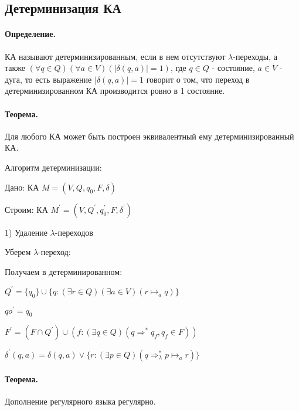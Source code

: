 \documentclass{report}
\newcommand{\pathto}[1][1]{ \Rightarrow^{*}_{#1} }
\begin{document}
\subsection{Детерминизация КА}
\paragraph*{Определение.}
КА называют детерминизированным, если в нем отсутствуют $\lambda$-переходы, а
также  $(\forall q \in Q)(\forall a \in V)( \mid \delta(q,a) \mid = 1)$, где
$q \in Q$ - состояние, $a \in V$ - дуга, то есть выражение $ \mid \delta(q,a) \mid = 1$ говорит о том,
что переход в детерминизированном КА производится ровно в 1 состояние.

\paragraph*{Теорема.}
Для любого КА может быть построен эквивалентный ему детерминизированный КА.

Алгоритм детерминизации:

Дано: КА $M = (V, Q, q_0,F,\delta)$

Строим: КА $M^{\prime} = (V, Q^{\prime},q_0^{\prime},F,\delta^{\prime})$

1) Удаление $\lambda$-переходов

Уберем $\lambda$-переход:

Получаем в детерминированном:

\medskip

$Q^{\prime} = \{q_0\} \cup \{q: (\exists r \in Q)(\exists a \in V)(r \mapsto_{a} q)\} $

$qo^{\prime} = q_0$ 

$F^{\prime} = (F \cap Q^{\prime}) \cup (f: (\exists q \in Q)(q \pathto[] q_{f}, q_{f} \in F))$

$\delta^{\prime}(q,a) = \delta(q,a) \lor \{r: (\exists p \in Q)(q \pathto[\lambda] p \mapsto_{a} r)\} $
\paragraph*{Теорема.}
Дополнение регулярного языка регулярно.
\end{document}
